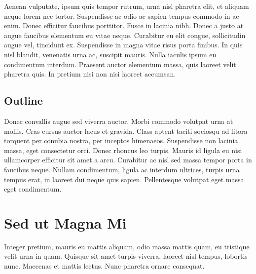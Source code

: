 \documentclass[a4paper,twoside,notitlepage,openright,11pt]{report}
\begin{document}
Aenean vulputate, ipsum quis tempor rutrum, urna nisl pharetra elit, et aliquam neque lorem nec tortor. Suspendisse ac odio ac sapien tempus commodo in ac enim. Donec efficitur faucibus porttitor. Fusce in lacinia nibh. Donec a justo at augue faucibus elementum eu vitae neque. Curabitur eu elit congue, sollicitudin augue vel, tincidunt ex. Suspendisse in magna vitae risus porta finibus. In quis nisl blandit, venenatis urna ac, suscipit mauris. Nulla iaculis ipsum eu condimentum interdum. Praesent auctor elementum massa, quis laoreet velit pharetra quis. In pretium nisi non nisi laoreet accumsan.


\section{Outline}

Donec convallis augue sed viverra auctor. Morbi commodo volutpat urna at mollis. Cras cursus auctor lacus et gravida. Class aptent taciti sociosqu ad litora torquent per conubia nostra, per inceptos himenaeos. Suspendisse non lacinia massa, eget consectetur orci. Donec rhoncus leo turpis. Mauris id ligula eu nisi ullamcorper efficitur sit amet a arcu. Curabitur ac nisl sed massa tempor porta in faucibus neque. Nullam condimentum, ligula ac interdum ultrices, turpis urna tempus erat, in laoreet dui neque quis sapien. Pellentesque volutpat eget massa eget condimentum.

\chapter{Sed ut Magna Mi}
Integer pretium, mauris eu mattis aliquam, odio massa mattis quam, eu tristique velit urna in quam. Quisque sit amet turpis viverra, laoreet nisl tempus, lobortis nunc. Maecenas et mattis lectus. Nunc pharetra ornare consequat.
\end{document}
